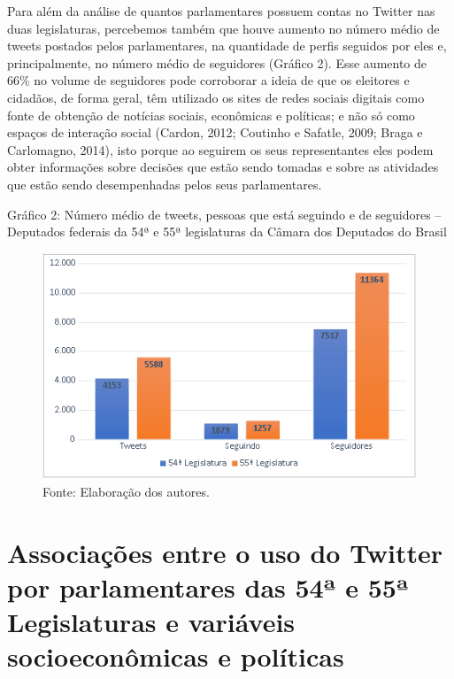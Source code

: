 Para além da análise de quantos parlamentares possuem contas no Twitter
nas duas legislaturas, percebemos também que houve aumento no número
médio de tweets postados pelos parlamentares, na quantidade de perfis
seguidos por eles e, principalmente, no número médio de seguidores
(Gráfico 2). Esse aumento de 66\% no volume de seguidores pode
corroborar a ideia de que os eleitores e cidadãos, de forma geral, têm
utilizado os sites de redes sociais digitais como fonte de obtenção de
notícias sociais, econômicas e políticas; e não só como espaços de
interação social (Cardon, 2012; Coutinho e Safatle, 2009; Braga e
Carlomagno, 2014), isto porque ao seguirem os seus representantes eles
podem obter informações sobre decisões que estão sendo tomadas e sobre
as atividades que estão sendo desempenhadas pelos seus parlamentares.

\begin{center}
Gráfico 2: Número médio de tweets, pessoas que está seguindo e de
seguidores -- Deputados federais da 54ª e 55ª legislaturas da Câmara dos
Deputados do Brasil

\begin{figure}[!ht]
\centering
 \includegraphics[width=\textwidth]{./imgs/graf2_2.png}
\caption{Fonte: Elaboração dos autores.}
\end{figure}
\end{center}


\section{Associações entre o uso do Twitter por parlamentares das 54ª
e 55ª Legislaturas e variáveis socioeconômicas e políticas}


